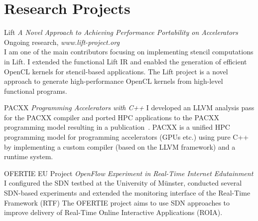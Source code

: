 \documentclass[11pt,a4paper,sans]{moderncv}        %
\begin{document}
\section{Research Projects}
    \cventry{}
                    {}{}{}{}{}


					{Lift}
					{\textit{A Novel Approach to Achieving Performance Portability on Accelerators}}{}{}
					{Ongoing research, \textit{www.lift-project.org}\\
					 I am one of the main contributors focusing on implementing stencil computations in Lift.
					 I extended the functional Lift IR and enabled the generation
					 of efficient OpenCL kernels for stencil-based applications.
					 The Lift project is a novel approach to generate high-performance OpenCL kernels
					 from high-level functional programs.\\
					}

					{PACXX}
					{\textit{Programming Accelerators with C++}}{}{}{
					 I developed an LLVM analysis pass for the PACXX compiler and ported HPC applications
					 to the PACXX programming model resulting in a publication~\cite{haidl}.
					 PACXX is a unified HPC programming model for programming accelerators
					 (GPUs etc.) using pure C++ by implementing a custom compiler
					 (based on the LLVM framework) and a runtime system.
					}

					{OFERTIE EU Project}
					{\textit{OpenFlow Experiment in Real-Time Internet Edutainment}}{}{}
					{
					 I configured the SDN
					 testbed at the University of Münster, conducted several SDN-based experiments
					 and extended the monitoring interface of the Real-Time Framework (RTF)
					 The OFERTIE project aims to use SDN approaches to improve delivery of Real-Time Online
					 Interactive Applications (ROIA).
					}

\end{document}

